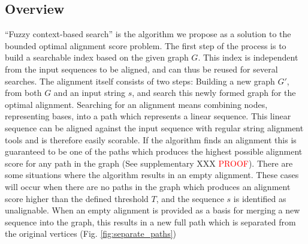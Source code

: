 \documentclass{article}
\begin{document}
\subsection{Overview}
``Fuzzy context-based search'' is the algorithm we propose as a solution to the bounded optimal alignment score problem. The first step of the process is to build a searchable index based on the given graph $G$. This index is independent from the input sequences to be aligned, and can thus be reused for several searches. The alignment itself consists of two steps: Building a new graph $G'$, from both $G$ and an input string $s$, and search this newly formed graph for the optimal alignment. Searching for an alignment means combining nodes, representing bases, into a path which represents a linear sequence. This linear sequence can be aligned against the input sequence with regular string alignment tools and is therefore easily scorable. If the algorithm finds an alignment this is guaranteed to be one of the paths which produces the highest possible alignment score for any path in the graph (See supplementary XXX \textcolor{red}{PROOF}). There are some situations where the algorithm results in an empty alignment. These cases will occur when there are no paths in the graph which produces an alignment score higher than the defined threshold $T$, and the sequence $s$ is identified as unalignable. When an empty alignment is provided as a basis for merging a new sequence into the graph, this results in a new full path which is separated from the original vertices (Fig. \ref{fig:separate_paths})
\end{document}
